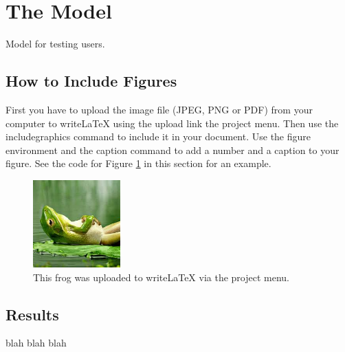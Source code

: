 \documentclass[11pt]{article}
\begin{document}
\section{The Model} \label{sec:Model}

Model for testing users. 


\subsection{How to Include Figures}

First you have to upload the image file (JPEG, PNG or PDF) from your computer to writeLaTeX using the upload link the project menu. Then use the includegraphics command to include it in your document. Use the figure environment and the caption command to add a number and a caption to your figure. See the code for Figure \ref{fig:frog} in this section for an example.

\begin{figure}
\centering
\includegraphics[width=0.3\textwidth]{frog.jpg}
\caption{\label{fig:frog}This frog was uploaded to writeLaTeX via the project menu.}
\end{figure}

\subsection{Results}
blah blah blah
\end{document}
